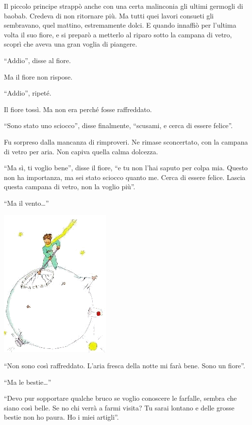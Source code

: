 \documentclass[11pt]{scrbook}
\begin{document}
Il piccolo principe strappò anche con una certa malinconia gli ultimi germogli di baobab. Credeva di non ritornare più. Ma tutti quei lavori consueti gli sembravano, quel mattino, estremamente dolci. E quando innaffiò per l'ultima volta il suo fiore, e si preparò a metterlo al riparo sotto la campana di vetro, scoprì che aveva una gran voglia di piangere.

``Addio'', disse al fiore.

Ma il fiore non rispose.

``Addio'', ripeté.

Il fiore tossì. Ma non era perché fosse raffreddato.

``Sono stato uno sciocco'', disse finalmente, ``scusami, e cerca di essere felice''.

Fu sorpreso dalla mancanza di rimproveri. Ne rimase sconcertato, con la campana di vetro per aria. Non capiva quella calma dolcezza.

``Ma sì, ti voglio bene'', disse il fiore, ``e tu non l'hai saputo per colpa mia. Questo non ha importanza, ma sei stato sciocco quanto me. Cerca di essere felice. Lascia questa campana di vetro, non la voglio più''.

``Ma il vento\ldots{}''

\begin{center}
\includegraphics{img/9a}
\end{center}

``Non sono così raffreddato. L'aria fresca della notte mi farà bene. Sono un fiore''.

``Ma le bestie\ldots{}''

``Devo pur sopportare qualche bruco se voglio conoscere le farfalle, sembra che siano così belle. Se no chi verrà a farmi visita? Tu sarai lontano e delle grosse bestie non ho paura. Ho i miei artigli''.
\end{document}
